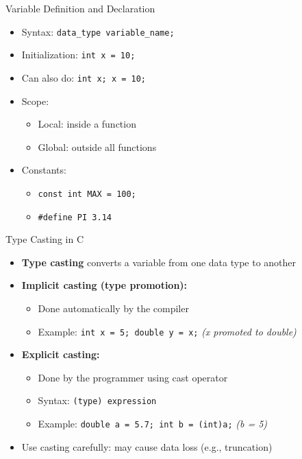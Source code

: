 \documentclass[12pt, aspectratio=169]{beamer}
\begin{document}
    \begin{frame}{Variable Definition and Declaration}
        \begin{itemize}
            \item Syntax: \texttt{data\_type variable\_name;}
            \item Initialization: \texttt{int x = 10;}
            \item Can also do: \texttt{int x; x = 10;}
            \item Scope:
                \begin{itemize}
                    \item Local: inside a function
                    \item Global: outside all functions
                \end{itemize}
            \item Constants:
                \begin{itemize}
                    \item \texttt{const int MAX = 100;}
                    \item \texttt{\#define PI 3.14}
                \end{itemize}
        \end{itemize}
    \end{frame}


    \begin{frame}{Type Casting in C}
        \begin{itemize}
            \item \textbf{Type casting} converts a variable from one data type to another
            \item \textbf{Implicit casting (type promotion):}
                \begin{itemize}
                    \item Done automatically by the compiler
                    \item Example: \texttt{int x = 5; double y = x;} \hfill \emph{(x promoted to double)}
                \end{itemize}
            \item \textbf{Explicit casting:}
                \begin{itemize}
                    \item Done by the programmer using cast operator
                    \item Syntax: \texttt{(type) expression}
                    \item Example: \texttt{double a = 5.7; int b = (int)a;} \hfill \emph{(b = 5)}
                \end{itemize}
            \item Use casting carefully: may cause data loss (e.g., truncation)
        \end{itemize}
    \end{frame}
\end{document}
